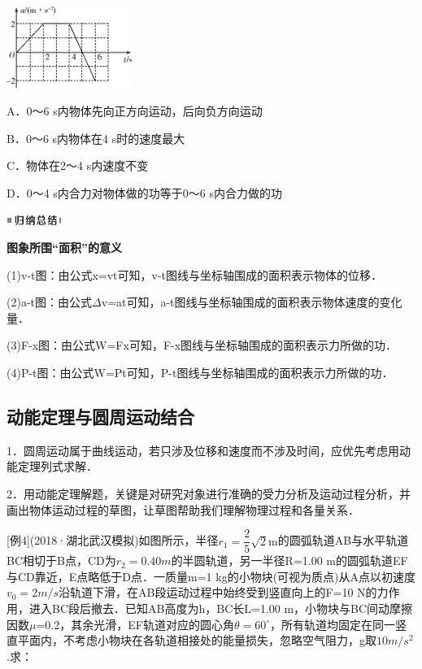 \documentclass[cn,10.5pt,chinese,mac,chinesefont=founder]{elegantbook}
\begin{document}
\begin{center}\includegraphics[width=1.60347in,height=1.04722in]{media/image225.png}\end{center}

A．0～6 s内物体先向正方向运动，后向负方向运动

B．0～6 s内物体在4 s时的速度最大

C．物体在2～4 s内速度不变

D．0～4 s内合力对物体做的功等于0～6 s内合力做的功

\begin{center}\includegraphics[width=0.70764in,height=0.12292in]{media/image13.png}

\textbf{图象所围``面积''的意义}
\end{center}


(1)v-t图：由公式x=vt可知，v-t图线与坐标轴围成的面积表示物体的位移．

(2)a-t图：由公式$\Delta$v=at可知，a-t图线与坐标轴围成的面积表示物体速度的变化量．

(3)F-x图：由公式W=Fx可知，F-x图线与坐标轴围成的面积表示力所做的功．

(4)P-t图：由公式W=Pt可知，P-t图线与坐标轴围成的面积表示力所做的功．


\subsection{动能定理与圆周运动结合}

1．圆周运动属于曲线运动，若只涉及位移和速度而不涉及时间，应优先考虑用动能定理列式求解．

2．用动能定理解题，关键是对研究对象进行准确的受力分析及运动过程分析，并画出物体运动过程的草图，让草图帮助我们理解物理过程和各量关系．

{[}例4{]}(2018·湖北武汉模拟)如图所示，半径$r_{1}=\dfrac{2}{5} \sqrt{2} \mathrm{m}$的圆弧轨道AB与水平轨道BC相切于B点，CD为$r_2=0.40m$的半圆轨道，另一半径R=1.00
m的圆弧轨道EF与CD靠近，E点略低于D点．一质量m=1
kg的小物块(可视为质点)从A点以初速度$v_0=2m/s$沿轨道下滑，在AB段运动过程中始终受到竖直向上的F=10
N的力作用，进入BC段后撤去．已知AB高度为h，BC长L=1.00
m，小物块与BC间动摩擦因数$\mu$=0.2，其余光滑，EF轨道对应的圆心角$\theta=60^\circ$，所有轨道均固定在同一竖直平面内，不考虑小物块在各轨道相接处的能量损失，忽略空气阻力，g取$10m/s^2$.求：
\end{document}
